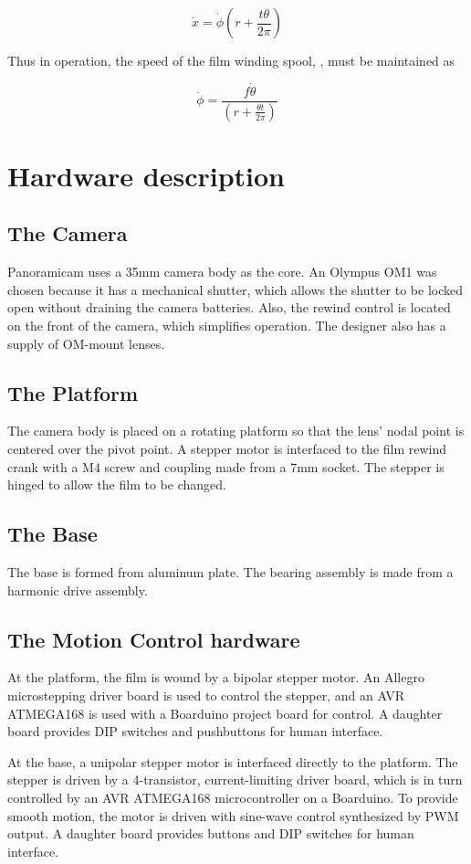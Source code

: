 \documentclass[dvips,12pt]{article}
\begin{document}
\begin{displaymath}
\dot{x} = \dot{\phi} \left( r+\frac{t\theta}{2\pi}\right)
\end{displaymath}

Thus in operation, the speed of the film winding spool, \math \dot{\theta} \), must be maintained as

\begin{displaymath}
\dot{\phi} = \frac{f\dot{\theta}}{\left(r+\frac{\theta t}{2 \pi}\right)}
\end{displaymath}

\section{Hardware description}
\subsection{The Camera}
Panoramicam uses a 35mm camera body as the core. An Olympus OM1 was chosen because it has a mechanical shutter, which allows the shutter to be locked open without draining the camera batteries. Also, the rewind control is located on the front of the camera, which simplifies operation. The designer also has a supply of OM-mount lenses. 
\subsection{The Platform}
The camera body is placed on a rotating platform so that the lens' nodal point is centered over the pivot point. A stepper motor is interfaced to the film rewind crank with a M4 screw and coupling made from a 7mm socket. The stepper is hinged to allow the film to be changed. 
\subsection{The Base}
The base is formed from aluminum plate. The bearing assembly is made from a harmonic drive assembly. 
\subsection{The Motion Control hardware}
At the platform, the film is wound by a bipolar stepper motor. An Allegro microstepping driver board is used to control the stepper, and an AVR ATMEGA168 is used with a Boarduino project board for control. A daughter board provides DIP switches and pushbuttons for human interface.

At the base, a unipolar stepper motor is interfaced directly to the platform. The stepper is driven by a 4-transistor, current-limiting driver board, which is in turn controlled by an AVR ATMEGA168 microcontroller on a Boarduino. To provide smooth motion, the motor is driven with sine-wave control synthesized by PWM output. A daughter board provides buttons and DIP switches for human interface.
\end{document}
